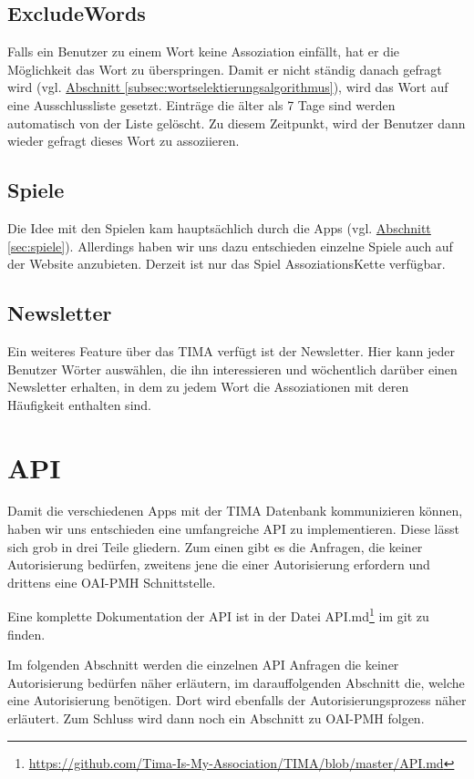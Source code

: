 \subsection{ExcludeWords}\label{subsec:excludewords}
Falls ein Benutzer zu einem Wort keine Assoziation einfällt, hat er die Möglichkeit das Wort zu überspringen. Damit er nicht ständig danach gefragt wird (vgl. \hyperref[subsec:wortselektierungsalgorithmus]{Abschnitt \ref*{subsec:wortselektierungsalgorithmus}}), wird das Wort auf eine Ausschlussliste gesetzt. Einträge die älter als 7 Tage sind werden automatisch von der Liste gelöscht. Zu diesem Zeitpunkt, wird der Benutzer dann wieder gefragt dieses Wort zu assoziieren.

\subsection{Spiele}\label{subsec:games}
Die Idee mit den Spielen kam hauptsächlich durch die Apps (vgl. \hyperref[sec:spiele]{Abschnitt \ref*{sec:spiele}}). Allerdings haben wir uns dazu entschieden einzelne Spiele auch auf der Website anzubieten. Derzeit ist nur das Spiel AssoziationsKette verfügbar.

\subsection{Newsletter}\label{subsec:newsletter}
Ein weiteres Feature über das TIMA verfügt ist der Newsletter. Hier kann jeder Benutzer Wörter auswählen, die ihn interessieren und wöchentlich darüber einen Newsletter erhalten, in dem zu jedem Wort die Assoziationen mit deren Häufigkeit enthalten sind.

\section{API}\label{sec:api}
Damit die verschiedenen Apps mit der TIMA Datenbank kommunizieren können, haben
wir uns entschieden eine umfangreiche API zu implementieren. Diese lässt sich
grob in drei Teile gliedern. Zum einen gibt es die Anfragen, die keiner
Autorisierung bedürfen, zweitens jene die einer Autorisierung erfordern und
drittens eine OAI-PMH Schnittstelle.

Eine komplette Dokumentation der API ist in der Datei API.md\footnote{\url{https://github.com/Tima-Is-My-Association/TIMA/blob/master/API.md}} im git zu finden.

Im folgenden Abschnitt werden die einzelnen API Anfragen die keiner Autorisierung bedürfen näher erläutern, im darauffolgenden Abschnitt die, welche eine Autorisierung benötigen. Dort wird ebenfalls der Autorisierungsprozess näher erläutert. Zum Schluss wird dann noch ein Abschnitt zu OAI-PMH folgen.

